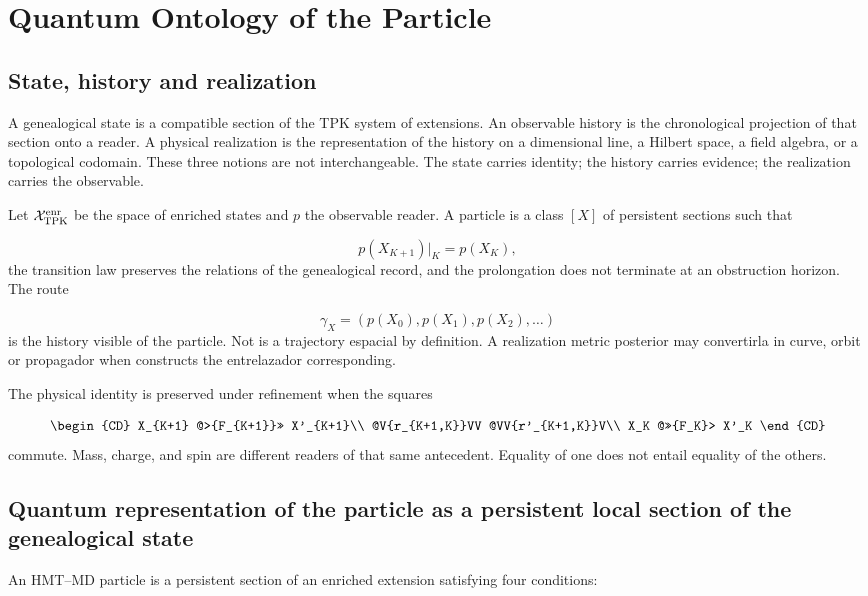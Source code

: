 \section{Quantum Ontology of the Particle}
\subsection{State, history and realization}
A genealogical state is a compatible section of the TPK system of extensions. An observable history is the chronological projection of that section onto a reader. A physical realization is the representation of the history on a dimensional line, a Hilbert space, a field algebra, or a topological codomain. These three notions are not interchangeable. The state carries identity; the history carries evidence; the realization carries the observable.

Let \(\mathcal X_{\rm TPK}^{\rm enr}\) be the space of enriched states and \(p\) the observable reader. A particle is a class \([X]\) of persistent sections such that

\[
p(X_{K+1})|_K=p(X_K),
\]
the transition law preserves the relations of the genealogical record, and the prolongation does not terminate at an obstruction horizon. The route

\[
\gamma_X=(p(X_0),p(X_1),p(X_2),\ldots)
\]
is the history visible of the particle. Not is a trajectory espacial by definition. A realization metric posterior may convertirla in curve, orbit or propagador when constructs the entrelazador corresponding.

The physical identity is preserved under refinement when the squares

\[
\begin{CD}
X_{K+1} @>{F_{K+1}}>> X'_{K+1}\\
@V{r_{K+1,K}}VV @VV{r'_{K+1,K}}V\\
X_K @>>{F_K}> X'_K
\end{CD}
\]
commute. Mass, charge, and spin are different readers of that same antecedent. Equality of one does not entail equality of the others.

\subsection{Quantum representation of the particle as a persistent local section of the genealogical state}
An HMT--MD particle is a persistent section of an enriched extension satisfying four conditions:

